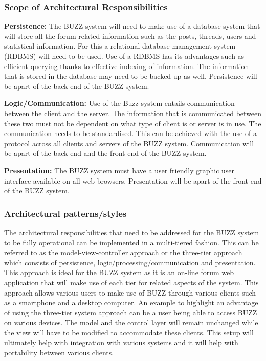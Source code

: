 \documentclass[a4paper,12pt]{article}
\begin{document}
\subsubsection{Scope of Architectural Responsibilities}


\begin{flushleft}
\textbf{Persistence:}
The BUZZ system will need to make use of a database system that will store all the forum related information such as the posts, threads, users and statistical information. For this a relational database management system (RDBMS) will need to be used. Use of a RDBMS has its advantages such as efficient querying thanks to effective indexing of information. The information that is stored in the database may need to be backed-up as well. Persistence will be apart of the back-end of the BUZZ system.
\end{flushleft}

\begin{flushleft}
\textbf{Logic/Communication:}
Use of the Buzz system entails communication between the client and the server. The information that is communicated between these two must not be dependent on what type of client is or server is in use. The communication needs to be standardised. This can be achieved with the use of a protocol across all clients and servers of the BUZZ system. Communication will be apart of the back-end and the front-end of the BUZZ system.
\end{flushleft}

\begin{flushleft}
\textbf{Presentation:}
The BUZZ system must have a user friendly graphic user interface available on all web browsers. Presentation will be apart of the front-end of the BUZZ system.
\end{flushleft}

\subsubsection{Architectural patterns/styles}
The architectural responsibilities that need to be addressed for the BUZZ system to be fully operational can be implemented in a multi-tiered fashion. This can be referred to as the model-view-controller approach or the three-tier approach which consists of persistence, logic/processing/communication and presentation. This approach is ideal for the BUZZ system as it is an on-line forum web application that will make use of each tier for related aspects of the system. This approach allows various users to make use of BUZZ through various clients such as a smartphone and a desktop computer. An example to highlight an advantage of using the three-tier system approach can be a user being able to access BUZZ on various devices. The model and the control layer will remain unchanged while the view will have to be modified to accommodate these clients.  This setup will ultimately help with integration with various systems and it will help with portability between various clients. 
\end{document}

